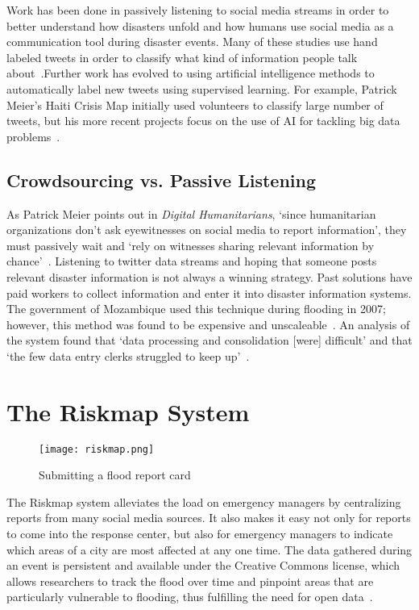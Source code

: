 Work has been done in passively listening to social media streams in order
to better understand how disasters unfold and how humans use social media as a
communication tool during disaster events. Many of these studies use hand
labeled tweets in order to classify what kind of information people talk
about~\cite{alamTwitterTaleThree2018}.Further work has evolved to using
artificial intelligence methods to automatically label new tweets using
supervised learning. For example, Patrick Meier's Haiti Crisis Map initially
used volunteers to classify large number of tweets, but his more recent projects
focus on the use of AI for tackling big data
problems~\cite{meierDigitalHumanitariansHow2015}.

\subsection{Crowdsourcing vs. Passive Listening} 
As Patrick Meier points out in \textit{Digital Humanitarians}, `since
humanitarian organizations don't ask eyewitnesses on social media to report
information', they must passively wait and `rely on witnesses sharing relevant
information by chance'~\cite{meierDigitalHumanitariansHow2015}. Listening to
twitter data streams and hoping that someone posts relevant disaster information
is not always a winning strategy. Past solutions have paid
workers to collect information and enter it into disaster information
systems. The government of Mozambique used this technique during flooding in
2007; however, this method was found to be expensive and
unscaleable~\cite{aminDataNaturalDisasters2008}. An analysis of the system found
that `data processing and consolidation [were] difficult' and that `the few data
entry clerks struggled to keep up'~\cite{aminDataNaturalDisasters2008}.

\section{The Riskmap System}\label{chap1:riskmap}
  \begin{figure} \texttt{[image: riskmap.png]}
  \caption{Submitting a flood report card}\label{fig:cards} \end{figure}
  The Riskmap system alleviates the load on
  emergency managers by centralizing reports from many social media
  sources. It also makes it easy not only for reports to come into the
  response center, but also for emergency managers to indicate which areas
  of a city are most affected at any one time. The data gathered during an
  event is persistent and available under the Creative Commons license,
  which allows researchers to track the flood over time and pinpoint areas
  that are particularly vulnerable to flooding, thus fulfilling the need
  for open data~\cite{PhilippinesPDCCollaborate,
  antaranews.comBNPBPetaBencanaId}.


